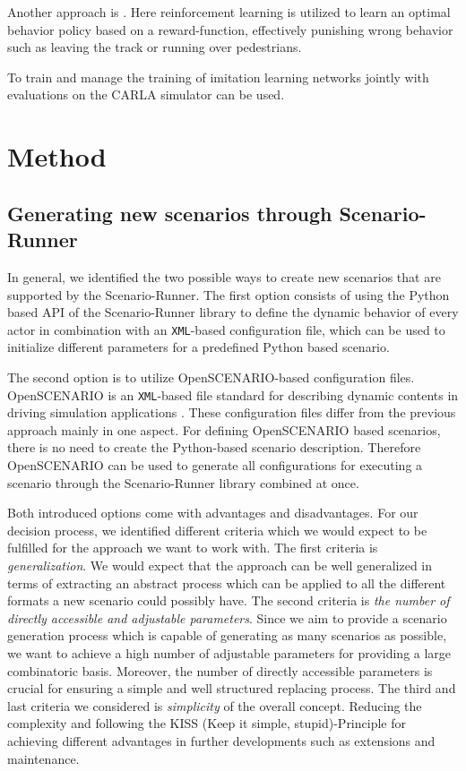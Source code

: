 \documentclass[conference, a4paper, 11pt]{IEEEtran}
\begin{document}
Another approach is  \cite{Toromanoff_2020_CVPR}. Here reinforcement learning is utilized to learn an optimal behavior policy based on a reward-function, effectively punishing wrong behavior such as leaving the track or running over pedestrians.

To train and manage the training of imitation learning networks jointly with evaluations on the CARLA simulator  \cite{felipecode:coiltraine} can be used.

\section{Method}

\subsection{Generating new scenarios through Scenario-Runner}
In general, we identified the two possible ways to create new scenarios that are supported by the Scenario-Runner.
The first option consists of using the Python based API of the Scenario-Runner library to define the dynamic behavior of every actor in combination with an \texttt{XML}-based configuration file, which can be used to initialize different parameters for a predefined Python based scenario.

The second option is to utilize OpenSCENARIO-based configuration files. OpenSCENARIO is an \texttt{XML}-based file standard for describing dynamic contents in driving simulation applications \cite{OpenScenario}. These configuration files differ from the previous approach mainly in one aspect. For defining OpenSCENARIO based scenarios, there is no need to create the Python-based scenario description. Therefore OpenSCENARIO can be used to generate all configurations for executing a scenario through the Scenario-Runner library combined at once. 

Both introduced options come with advantages and disadvantages. For our decision process, we identified different criteria which we would expect to be fulfilled for the approach we want to work with. 
The first criteria is \textit{generalization}. We would expect that the approach can be well generalized in terms of  extracting an abstract process which can be applied to all the different formats a new scenario could possibly have.
The second criteria is \textit{the number of directly accessible and adjustable parameters}. Since we aim to provide a scenario generation process which is capable of generating as many scenarios as possible, we want to achieve a high number of adjustable parameters for providing a large combinatoric basis. Moreover, the number of directly accessible parameters is crucial for ensuring a simple and well structured replacing process.
The third and last criteria we considered is \textit{simplicity} of the overall concept. Reducing the complexity and  following the KISS (Keep it simple, stupid)-Principle for achieving different advantages in further developments such as extensions and maintenance. 
\end{document}
